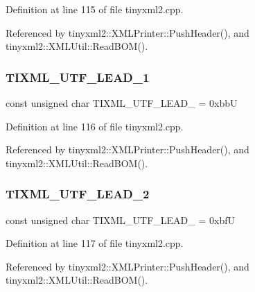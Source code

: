 Definition at line 115 of file tinyxml2.\+cpp.



Referenced by tinyxml2\+::\+X\+M\+L\+Printer\+::\+Push\+Header(), and tinyxml2\+::\+X\+M\+L\+Util\+::\+Read\+B\+O\+M().

\mbox{\label{tinyxml2_8cpp_a3cda92a178036c812663a7b75c5e04d0}} 
\subsubsection{TIXML\_UTF\_LEAD\_1}
{\footnotesize\ttfamily const unsigned char T\+I\+X\+M\+L\+\_\+\+U\+T\+F\+\_\+\+L\+E\+A\+D\+\_ = 0xbbU\hspace{0.3cm}{\ttfamily [static]}}



Definition at line 116 of file tinyxml2.\+cpp.



Referenced by tinyxml2\+::\+X\+M\+L\+Printer\+::\+Push\+Header(), and tinyxml2\+::\+X\+M\+L\+Util\+::\+Read\+B\+O\+M().

\mbox{\label{tinyxml2_8cpp_a8e36ce25f81f009c066037e937da3a6a}} 
\subsubsection{TIXML\_UTF\_LEAD\_2}
{\footnotesize\ttfamily const unsigned char T\+I\+X\+M\+L\+\_\+\+U\+T\+F\+\_\+\+L\+E\+A\+D\+\_ = 0xbfU\hspace{0.3cm}{\ttfamily [static]}}



Definition at line 117 of file tinyxml2.\+cpp.



Referenced by tinyxml2\+::\+X\+M\+L\+Printer\+::\+Push\+Header(), and tinyxml2\+::\+X\+M\+L\+Util\+::\+Read\+B\+O\+M().

